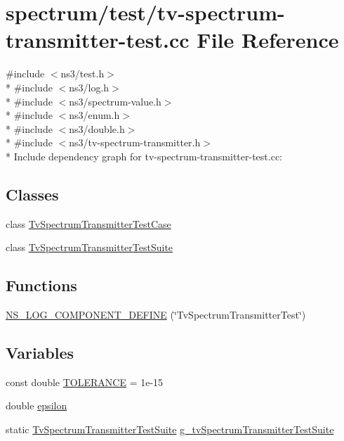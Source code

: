 \hypertarget{tv-spectrum-transmitter-test_8cc}{}\section{spectrum/test/tv-\/spectrum-\/transmitter-\/test.cc File Reference}
\label{tv-spectrum-transmitter-test_8cc}
{\ttfamily \#include $<$ns3/test.\+h$>$}\\*
{\ttfamily \#include $<$ns3/log.\+h$>$}\\*
{\ttfamily \#include $<$ns3/spectrum-\/value.\+h$>$}\\*
{\ttfamily \#include $<$ns3/enum.\+h$>$}\\*
{\ttfamily \#include $<$ns3/double.\+h$>$}\\*
{\ttfamily \#include $<$ns3/tv-\/spectrum-\/transmitter.\+h$>$}\\*
Include dependency graph for tv-\/spectrum-\/transmitter-\/test.cc\+:
\subsection*{Classes}
\begin{DoxyCompactItemize}
\item 
class \hyperlink{classTvSpectrumTransmitterTestCase}{Tv\+Spectrum\+Transmitter\+Test\+Case}
\item 
class \hyperlink{classTvSpectrumTransmitterTestSuite}{Tv\+Spectrum\+Transmitter\+Test\+Suite}
\end{DoxyCompactItemize}
\subsection*{Functions}
\begin{DoxyCompactItemize}
\item 
\hyperlink{tv-spectrum-transmitter-test_8cc_a0adcd1cd63022948b620cc5ae6a625b9}{N\+S\+\_\+\+L\+O\+G\+\_\+\+C\+O\+M\+P\+O\+N\+E\+N\+T\+\_\+\+D\+E\+F\+I\+NE} (\char`\"{}Tv\+Spectrum\+Transmitter\+Test\char`\"{})
\end{DoxyCompactItemize}
\subsection*{Variables}
\begin{DoxyCompactItemize}
\item 
const double \hyperlink{tv-spectrum-transmitter-test_8cc_a89311a98397f9d6967d2cb10d5152d77}{T\+O\+L\+E\+R\+A\+N\+CE} = 1e-\/15
\item 
double \hyperlink{tv-spectrum-transmitter-test_8cc_a4904cc82627458fdf6672ccc0b2802c7}{epsilon}
\item 
static \hyperlink{classTvSpectrumTransmitterTestSuite}{Tv\+Spectrum\+Transmitter\+Test\+Suite} \hyperlink{tv-spectrum-transmitter-test_8cc_ae6fd67781531f2f8ca5b900f2b9c35f7}{g\+\_\+tv\+Spectrum\+Transmitter\+Test\+Suite}
\end{DoxyCompactItemize}


